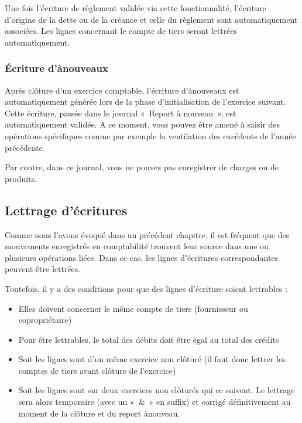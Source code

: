 \documentclass[a4paper,10pt,oneside,french]{sphinxmanual}
\begin{document}
\sphinxAtStartPar
Une fois l’écriture de règlement validée via cette fonctionnalité, l’écriture d’origine de la dette ou de la créance et celle du règlement sont automatiquement associées. Les lignes concernant le compte de tiers seront lettrées automatiquement.


\subsubsection{Écriture d’à\sphinxhyphen{}nouveaux}
\label{\detokenize{accounting/entity:ecriture-d-a-nouveaux}}
\sphinxAtStartPar
Après clôture d’un exercice comptable, l’écriture d’à\sphinxhyphen{}nouveaux est automatiquement générée lors de la phase d’initialisation de l’exercice suivant. Cette écriture, passée dans le journal « Report à nouveau », est automatiquement validée.
A ce moment, vous pouvez être amené à saisir des opérations spécifiques comme par exemple la ventilation des excédents de l’année précédente.

\sphinxAtStartPar
Par contre, dans ce journal, vous ne pouvez pas enregistrer de charges ou de produits.


\subsection{Lettrage d’écritures}
\label{\detokenize{accounting/entity:lettrage-d-ecritures}}
\sphinxAtStartPar
Comme nous l’avons évoqué dans un précédent chapitre, il est fréquent que des mouvements enregistrés en comptabilité trouvent leur source dans une ou plusieurs opérations liées. Dans ce cas, les lignes d’écritures correspondantes peuvent être lettrées.

\sphinxAtStartPar
Toutefois, il y a des conditions pour que des lignes d’écriture soient lettrables :
\begin{itemize}
\item {} 
\sphinxAtStartPar
Elles doivent concerner le même compte de tiers (fournisseur ou copropriétaire)

\item {} 
\sphinxAtStartPar
Pour être lettrables, le total des débits doit être égal au total des crédits

\item {} 
\sphinxAtStartPar
Soit les lignes sont d’un même exercice non clôturé (il faut donc lettrer les comptes de tiers avant clôture de l’exercice)

\item {} 
\sphinxAtStartPar
Soit les lignes sont sur deux exercices non clôturés qui ce suivent. Le lettrage sera alors temporaire (avec un « \& » en suffix) et corrigé définitivement au moment de la clôture et du report à\sphinxhyphen{}nouveau.

\end{itemize}
\end{document}
